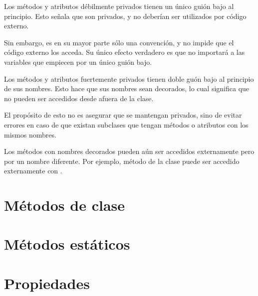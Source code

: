 Los métodos y atributos débilmente privados tienen un único guión bajo al principio. Esto señala que son privados, y no deberían ser utilizados por código externo.\smallskip



Sin embargo, es en su mayor parte sólo una convención, y no impide que el código externo los acceda. Su único efecto verdadero es que  no importará a las variables que empiecen por un único guión bajo.


Los métodos y atributos fuertemente privados tienen doble guón bajo al principio de sus nombres. Esto hace que sus nombres sean decorados, lo cual significa que no pueden ser accedidos desde afuera de la clase.\smallskip

El propósito de esto no es asegurar que se mantengan privados, sino de evitar errores en caso de que existan subclases que tengan métodos o atributos con los mismos nombres.\smallskip

Los métodos con nombres decorados pueden aún ser accedidos externamente pero por un nombre diferente. Por ejemplo, método  de la clase  puede ser accedido externamente con .


\section{Métodos de clase}



\section{Métodos estáticos}

\section{Propiedades}

\clearpage